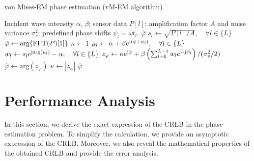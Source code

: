 \documentclass[journal,twocolumn]{IEEEtran}
\theoremstyle{nonumberplain}
\def \arg {\text{arg}}
\begin{document}
    \begin{algorithm}[t] 
        \caption{von Mises-EM phase estimation (vM-EM algorithm)} \label{alg:vM-EM}
        \begin{algorithmic}[1]
            \REQUIRE Incident wave intensity $\alpha$, $\beta$; sensor data $P[l]$; amplification factor $A$ and noise variance $\sigma_v^2$; predefined phase shifts $\psi_l=\omega t_l$.
            \ENSURE $\hat{\varphi}$
            \STATE $s_l \leftarrow \sqrt{P[l]/A}, \quad \forall l\in \{L\}$
            \STATE $\hat{\varphi} \leftarrow \arg\{{\rm FFT}(P)[1]\}$
            \STATE $\kappa \leftarrow 1$
                \STATE $\mu_l \leftarrow \alpha + \beta e^{{\rm j} (\hat{\varphi}+\psi_l)}, \quad \forall l\in \{L\}$
                \STATE $w_l \leftarrow s_l e^{{\rm j} \arg(\mu_l)} - \alpha, \quad \forall l\in \{L\}$
                \STATE $z_\varphi \leftarrow \kappa e^{{\rm j} \hat{\varphi}} + \beta \left( \sum_{l=0}^{L-1}{w_l e^{-{\rm j} \psi_l}}\right) / (\sigma_v^2/2)$
                \STATE $\hat{\varphi} \leftarrow \arg(z_\varphi)$
                \STATE $\kappa \leftarrow |z_\varphi|$
            \ENDWHILE
            \RETURN $\hat{\varphi}$
        \end{algorithmic}
    \end{algorithm}
    
\section{Performance Analysis}
\label{Performance Analysis}
    In this section, we derive the exact expression of the CRLB in the phase estimation problem. 
    To simplify the calculation, we provide an asymptotic expression of the CRLB.
    Moreover, we also reveal the mathematical properties of the obtained CRLB and provide the error analysis.
\end{document}
